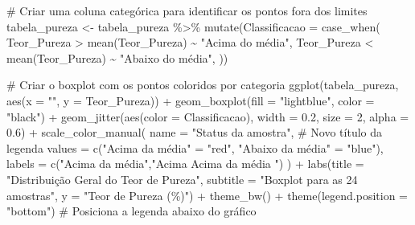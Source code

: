 \documentclass[
  letterpaper,
  DIV=11,
  numbers=noendperiod]{scrartcl}
\newenvironment{Shaded}{\begin{snugshade}}{\end{snugshade}}
\newcommand{\AttributeTok}[1]{\textcolor[rgb]{0.40,0.45,0.13}{#1}}
\newcommand{\CommentTok}[1]{\textcolor[rgb]{0.37,0.37,0.37}{#1}}
\newcommand{\DecValTok}[1]{\textcolor[rgb]{0.68,0.00,0.00}{#1}}
\newcommand{\FloatTok}[1]{\textcolor[rgb]{0.68,0.00,0.00}{#1}}
\newcommand{\FunctionTok}[1]{\textcolor[rgb]{0.28,0.35,0.67}{#1}}
\newcommand{\NormalTok}[1]{\textcolor[rgb]{0.00,0.23,0.31}{#1}}
\newcommand{\OtherTok}[1]{\textcolor[rgb]{0.00,0.23,0.31}{#1}}
\newcommand{\SpecialCharTok}[1]{\textcolor[rgb]{0.37,0.37,0.37}{#1}}
\newcommand{\StringTok}[1]{\textcolor[rgb]{0.13,0.47,0.30}{#1}}
\begin{document}
\begin{Shaded}
\begin{Highlighting}[]
\CommentTok{\# Criar uma coluna categórica para identificar os pontos fora dos limites}
\NormalTok{tabela\_pureza }\OtherTok{\textless{}{-}}\NormalTok{ tabela\_pureza }\SpecialCharTok{\%\textgreater{}\%}
  \FunctionTok{mutate}\NormalTok{(}\AttributeTok{Classificacao =} \FunctionTok{case\_when}\NormalTok{(}
\NormalTok{    Teor\_Pureza }\SpecialCharTok{\textgreater{}} \FunctionTok{mean}\NormalTok{(Teor\_Pureza) }\SpecialCharTok{\textasciitilde{}} \StringTok{"Acima do média"}\NormalTok{,}
\NormalTok{    Teor\_Pureza }\SpecialCharTok{\textless{}} \FunctionTok{mean}\NormalTok{(Teor\_Pureza) }\SpecialCharTok{\textasciitilde{}} \StringTok{"Abaixo do média"}\NormalTok{,}
\NormalTok{  ))}

\CommentTok{\# Criar o boxplot com os pontos coloridos por categoria}
\FunctionTok{ggplot}\NormalTok{(tabela\_pureza, }\FunctionTok{aes}\NormalTok{(}\AttributeTok{x =} \StringTok{""}\NormalTok{, }\AttributeTok{y =}\NormalTok{ Teor\_Pureza)) }\SpecialCharTok{+}
  \FunctionTok{geom\_boxplot}\NormalTok{(}\AttributeTok{fill =} \StringTok{"lightblue"}\NormalTok{, }\AttributeTok{color =} \StringTok{"black"}\NormalTok{) }\SpecialCharTok{+}
  \FunctionTok{geom\_jitter}\NormalTok{(}\FunctionTok{aes}\NormalTok{(}\AttributeTok{color =}\NormalTok{ Classificacao), }\AttributeTok{width =} \FloatTok{0.2}\NormalTok{, }\AttributeTok{size =} \DecValTok{2}\NormalTok{, }\AttributeTok{alpha =} \FloatTok{0.6}\NormalTok{) }\SpecialCharTok{+}
  \FunctionTok{scale\_color\_manual}\NormalTok{(}
    \AttributeTok{name =} \StringTok{"Status da amostra"}\NormalTok{,  }\CommentTok{\# Novo título da legenda}
    \AttributeTok{values =} \FunctionTok{c}\NormalTok{(}\StringTok{"Acima da média"} \OtherTok{=} \StringTok{"red"}\NormalTok{, }\StringTok{"Abaixo da média"} \OtherTok{=} \StringTok{"blue"}\NormalTok{),}
    \AttributeTok{labels =} \FunctionTok{c}\NormalTok{(}\StringTok{"Acima da média"}\NormalTok{,}\StringTok{"Acima Acima da média "}\NormalTok{)}
\NormalTok{  ) }\SpecialCharTok{+}
  \FunctionTok{labs}\NormalTok{(}\AttributeTok{title =} \StringTok{"Distribuição Geral do Teor de Pureza"}\NormalTok{,}
       \AttributeTok{subtitle =} \StringTok{"Boxplot para as 24 amostras"}\NormalTok{,}
       \AttributeTok{y =} \StringTok{"Teor de Pureza (\%)"}\NormalTok{) }\SpecialCharTok{+}
  \FunctionTok{theme\_bw}\NormalTok{() }\SpecialCharTok{+}
  \FunctionTok{theme}\NormalTok{(}\AttributeTok{legend.position =} \StringTok{"bottom"}\NormalTok{)  }\CommentTok{\# Posiciona a legenda abaixo do gráfico}
\end{Highlighting}
\end{Shaded}
\end{document}
